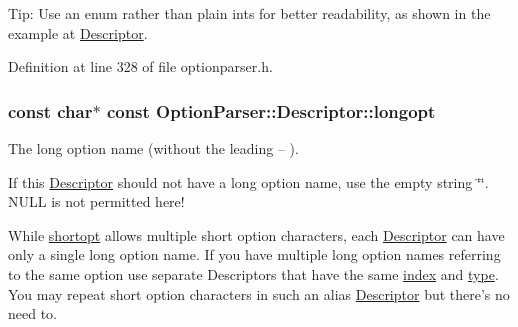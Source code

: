 \begin{DoxyParagraph}{Tip\-:}
Use an enum rather than plain ints for better readability, as shown in the example at \hyperlink{struct_option_parser_1_1_descriptor}{Descriptor}. 
\end{DoxyParagraph}


Definition at line 328 of file optionparser.\-h.

\hypertarget{struct_option_parser_1_1_descriptor_ab9db8207bae68dd5c4ee83e05189a9d0}{
\subsubsection[{longopt}]{\setlength{\rightskip}{0pt plus 5cm}const char$\ast$ const Option\-Parser\-::\-Descriptor\-::longopt}}\label{struct_option_parser_1_1_descriptor_ab9db8207bae68dd5c4ee83e05189a9d0}


The long option name (without the leading {\ttfamily --} ). 

If this \hyperlink{struct_option_parser_1_1_descriptor}{Descriptor} should not have a long option name, use the empty string \char`\"{}\char`\"{}. N\-U\-L\-L is not permitted here!

While \hyperlink{struct_option_parser_1_1_descriptor_a21415d74531b006e9a7a06ccadbd2721}{shortopt} allows multiple short option characters, each \hyperlink{struct_option_parser_1_1_descriptor}{Descriptor} can have only a single long option name. If you have multiple long option names referring to the same option use separate Descriptors that have the same \hyperlink{struct_option_parser_1_1_descriptor_ae62860781844b44c0bd4f730c96701d7}{index} and \hyperlink{struct_option_parser_1_1_descriptor_a070d24a33fc9f30cf3deafa428ff7fa7}{type}. You may repeat short option characters in such an alias \hyperlink{struct_option_parser_1_1_descriptor}{Descriptor} but there's no need to.

